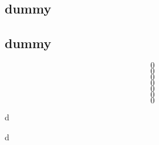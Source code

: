 \documentclass[11pt,a4paper]{article}
\begin{document}
\subsection{dummy}\label{ssec:worked}
\subsection{dummy}\label{ssec:einstein-numid}
\begin{equation}\label{eq:implicit}0\end{equation}
\begin{equation}\label{eq:weighted}0\end{equation}
\begin{equation}\label{eq:complete}0\end{equation}
\begin{equation}\label{eq:Svib-einstein}0\end{equation}
\begin{equation}\label{eq:dSvib}0\end{equation}
\begin{equation}\label{eq:dUvib}0\end{equation}
\begin{equation}\label{eq:Se-ch2}0\end{equation}
\begin{table}[h]\caption{dummy}\label{tab:ds}\centering d\end{table}
\begin{table}[h]\caption{dummy}\label{tab:qrev}\centering d\end{table}
\clearpage

\clearpage

\end{document}
